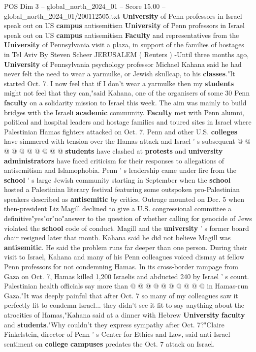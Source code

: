 \begin{textsample}{POS Dim 3 – global\_north\_2024\_01 – Score 15.00 – global\_north\_2024\_01/200112505.txt}  \label{ex:f3_pos_220}
\textbf{University} of Penn professors in Israel speak out on US \textbf{campus} antisemitism \textbf{University} of Penn professors in Israel speak out on US \textbf{campus} antisemitism \textbf{Faculty} and representatives from the \textbf{University} of Pennsylvania visit a plaza, in support of the families of hostages in Tel Aviv By Steven Scheer JERUSALEM ( Reuters ) -Until three months ago, \textbf{University} of Pennsylvania psychology professor Michael Kahana said he had never felt the need to wear a yarmulke, or Jewish skullcap, to his \textbf{classes}."It started Oct. 7.
I now feel that if I don't wear a yarmulke then my \textbf{students} might not feel that they can,"said Kahana, one of the organisers of some 30 Penn \textbf{faculty} on a solidarity mission to Israel this week.
The aim was mainly to build bridges with the Israeli \textbf{academic} community. \textbf{Faculty} met with Penn alumni, political and hospital leaders and hostage families and toured sites in Israel where Palestinian Hamas fighters attacked on Oct. 7.
Penn and other U.S. \textbf{colleges} have simmered with tension over the Hamas attack and Israel ' s subsequent @ @ @ @ @ @ @ @ @ @ \textbf{students} have clashed at \textbf{protests} and \textbf{university} \textbf{administrators} have faced criticism for their responses to allegations of antisemitism and Islamophobia.
Penn ' s leadership came under fire from the \textbf{school} ' s large Jewish community starting in September when the \textbf{school} hosted a Palestinian literary festival featuring some outspoken pro-Palestinian speakers described as \textbf{antisemitic} by critics.
Outrage mounted on Dec. 5 when then-president Liz Magill declined to give a U.S. congressional committee a definitive"yes"or"no"answer to the question of whether calling for genocide of Jews violated the \textbf{school} code of conduct.
Magill and the \textbf{university} ' s former board chair resigned later that month.
Kahana said he did not believe Magill was \textbf{antisemitic}.
He said the problem runs far deeper than one person.
During their visit to Israel, Kahana and many of his Penn colleagues voiced dismay at fellow Penn professors for not condemning Hamas.
In its cross-border rampage from Gaza on Oct. 7, Hamas killed 1,200 Israelis and abducted 240 by Israel ' s count.
Palestinian health officials say more than @ @ @ @ @ @ @ @ @ @ in Hamas-run Gaza."It was deeply painful that after Oct. 7 so many of my colleagues saw it perfectly fit to condemn Israel... they didn't see it fit to say anything about the atrocities of Hamas,"Kahana said at a dinner with Hebrew \textbf{University} \textbf{faculty} and \textbf{students}."Why couldn't they express sympathy after Oct. 7?"Claire Finkelstein, director of Penn ' s Center for Ethics and Law, said anti-Israel sentiment on \textbf{college} \textbf{campuses} predates the Oct. 7 attack on Israel.

\end{textsample}
